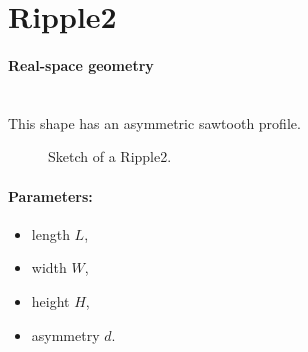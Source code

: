 \newpage%
\section{Ripple2}   

\paragraph{Real-space geometry}\mbox{}\\
This shape has an asymmetric sawtooth profile.

\begin{figure}[ht]
\hfill
{}
\hfill
{}
\hfill
\caption{Sketch of a Ripple2.}
\label{fig:ripple2}
\end{figure}

\FloatBarrier

\paragraph{Parameters:}
\begin{itemize}
\item length $L$, 
\item width $W$, 
\item height $H$,
\item asymmetry $d$. 
\end{itemize}

